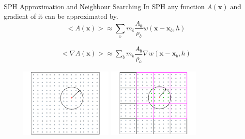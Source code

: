 \documentclass{beamer}
\begin{document}
\begin{frame}{SPH Approximation and Neighbour Searching}
In SPH any function $A(\textbf{x})$ and gradient of it can be approximated by.
\begin{equation}
<A\left(\textbf{x}\right)> \approx \sum_b m_b \dfrac{A_b}{\rho_b} w\left(\textbf{x}-\textbf{x}_b, h\right)
\label{eq:SPH-approximation-sum}
\end{equation}

\begin{equation}
\begin{split}
<\nabla A\left(\textbf{x}\right)> \approx \sum_b m_b \dfrac{A_b}{\rho_b} \nabla w\left(\textbf{x} - \textbf{x}_b, h\right)
\end{split} 
\label{eq:SPH-scalar-function-gradient}
\end{equation}

\begin{figure}
\flushleft
\includegraphics[width=0.415\textwidth]{Neighor-searching-noBG}
\hfill
\includegraphics[width=0.415\textwidth]{Neighbor-Search}
\end{figure}
\end{frame}
\end{document}
